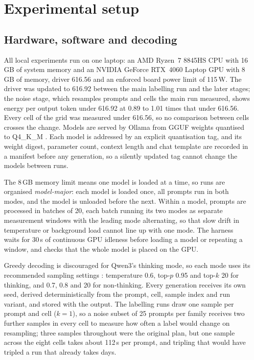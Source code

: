 \section{Experimental setup}
\label{sec:setup}

\subsection{Hardware, software and decoding}
\label{sec:setup-hardware}

All local experiments run on one laptop: an AMD Ryzen~7 8845HS CPU with
16\,GB of system memory and an NVIDIA GeForce RTX~4060 Laptop GPU with 8\,GB
of memory, driver 616.56 and an enforced board power limit of 115\,W. The
driver was updated to 616.92 between the main labelling run and the later
stages; the noise stage, which resamples prompts and cells the main run
measured, shows energy per output token under 616.92 at 0.89 to 1.01 times
that under 616.56. Every cell of the grid was measured under 616.56, so no
comparison between cells crosses the change. Models are served by Ollama \cite{ollama} from GGUF
weights quantised to Q4\_K\_M \cite{gerganov2023llamacpp}. Each model is
addressed by an explicit quantisation tag, and its weight digest, parameter
count, context length and chat template are recorded in a manifest before any
generation, so a silently updated tag cannot change the models between runs.

The 8\,GB memory limit means one model is loaded at a time, so runs are
organised \emph{model-major}: each model is loaded once, all prompts run in
both modes, and the model is unloaded before the next. Within a model,
prompts are processed in batches of 20, each batch running its two modes as
separate measurement windows with the leading mode alternating, so that slow
drift in temperature or background load cannot line up with one mode. The
harness waits for 30\,s of continuous GPU idleness before loading a model or
repeating a window, and checks that the whole model is placed on the GPU.

Greedy decoding is discouraged for Qwen3's thinking mode, so each mode uses
its recommended sampling settings \cite{qwen2025modelcard}: temperature 0.6,
top-$p$ 0.95 and top-$k$ 20 for thinking, and 0.7, 0.8 and 20 for
non-thinking. Every generation receives its own seed, derived
deterministically from the prompt, cell, sample index and run variant, and
stored with the output. The labelling runs draw one sample per prompt and
cell ($k = 1$), so a noise subset of 25 prompts per family receives two
further samples in every cell to measure how often a label would change on
resampling; three samples throughout were the original plan, but one sample
across the eight cells takes about 112\,s per prompt, and tripling that would
have tripled a run that already takes days.

